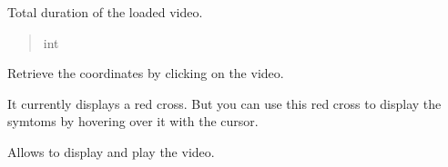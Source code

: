 \documentclass[letterpaper,10pt,english]{sphinxmanual}
\begin{document}
\begin{fulllineitems}
\begin{fulllineitems}
\begin{quote}
\begin{description}
\end{description}\end{quote}

\end{fulllineitems}


\begin{fulllineitems}
\label{\detokenize{general_interface:general_interface.LecteurVideo.duree_totale}}
\pysigstartsignatures
{}
\pysigstopsignatures
\sphinxAtStartPar
Total duration of the loaded video.
\begin{quote}\begin{description}
\sphinxAtStartPar
int

\end{description}\end{quote}

\end{fulllineitems}


\begin{fulllineitems}
\label{\detokenize{general_interface:general_interface.LecteurVideo.afficher_menu_annotations}}
\pysigstartsignatures
{}
\pysigstopsignatures
\sphinxAtStartPar
Retrieve the coordinates by clicking on the video.

\sphinxAtStartPar
It currently displays a red cross.
But you can use this red cross to display the symtoms by hovering over it with the cursor.

\end{fulllineitems}


\begin{fulllineitems}
\label{\detokenize{general_interface:general_interface.LecteurVideo.afficher_video}}
\pysigstartsignatures
{}
\pysigstopsignatures
\sphinxAtStartPar
Allows to display and play the video.


\end{fulllineitems}
\end{fulllineitems}
\end{document}
